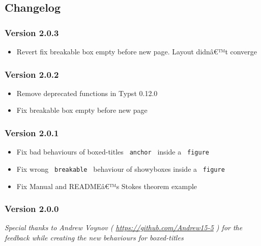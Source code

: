 \subsection{Changelog}\label{changelog}

\subsubsection{Version 2.0.3}\label{version-2.0.3}

\begin{itemize}
\tightlist
\item
  Revert fix breakable box empty before new page. Layout didnâ€™t
  converge
\end{itemize}

\subsubsection{Version 2.0.2}\label{version-2.0.2}

\begin{itemize}
\tightlist
\item
  Remove deprecated functions in Typst 0.12.0
\item
  Fix breakable box empty before new page
\end{itemize}

\subsubsection{Version 2.0.1}\label{version-2.0.1}

\begin{itemize}
\tightlist
\item
  Fix bad behaviours of boxed-titles \texttt{\ anchor\ } inside a
  \texttt{\ figure\ }
\item
  Fix wrong \texttt{\ breakable\ } behaviour of showyboxes inside a
  \texttt{\ figure\ }
\item
  Fix Manual and READMEâ€™s Stokes theorem example
\end{itemize}

\subsubsection{Version 2.0.0}\label{version-2.0.0}

\emph{Special thanks to Andrew Voynov (
\url{https://github.com/Andrew15-5} ) for the feedback while creating
the new behaviours for boxed-titles}

